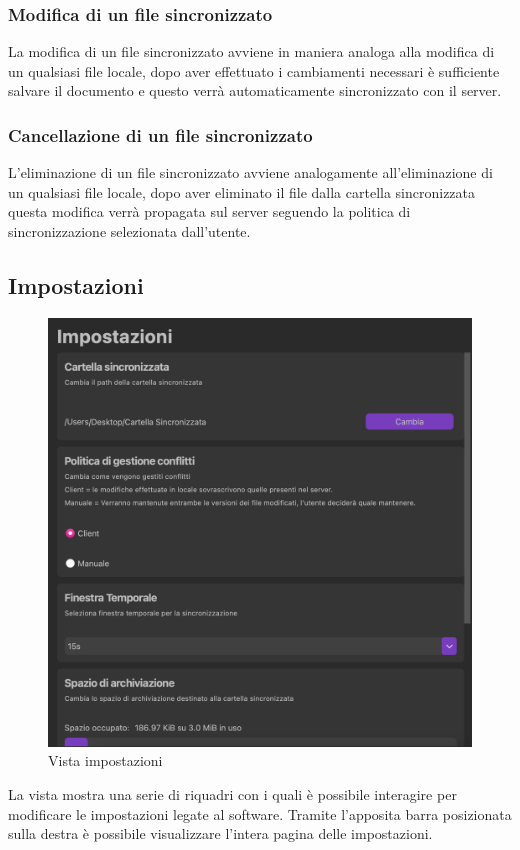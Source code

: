 \subsubsection{Modifica di un file sincronizzato}
La modifica di un file sincronizzato avviene in maniera analoga alla modifica di un qualsiasi file locale, dopo aver effettuato i cambiamenti necessari è sufficiente salvare il documento e questo verrà automaticamente sincronizzato con il server.
\subsubsection{Cancellazione di un file sincronizzato}
L'eliminazione di un file sincronizzato avviene analogamente all'eliminazione di un qualsiasi file locale, dopo aver eliminato il file dalla cartella sincronizzata questa modifica verrà propagata sul server seguendo la politica di sincronizzazione selezionata dall'utente.

\subsection{Impostazioni}
\label{sec:impostazioni}
\begin{figure}[H]
    \centering
    \includegraphics[scale = 0.7]{components/img/vistaImp.png}
    \caption{Vista impostazioni}
    \label{fig:impostazioni}
\end{figure}
La vista mostra una serie di riquadri con i quali è possibile interagire per modificare le impostazioni legate al software. Tramite l'apposita barra posizionata sulla destra è possibile visualizzare l'intera pagina delle impostazioni.


